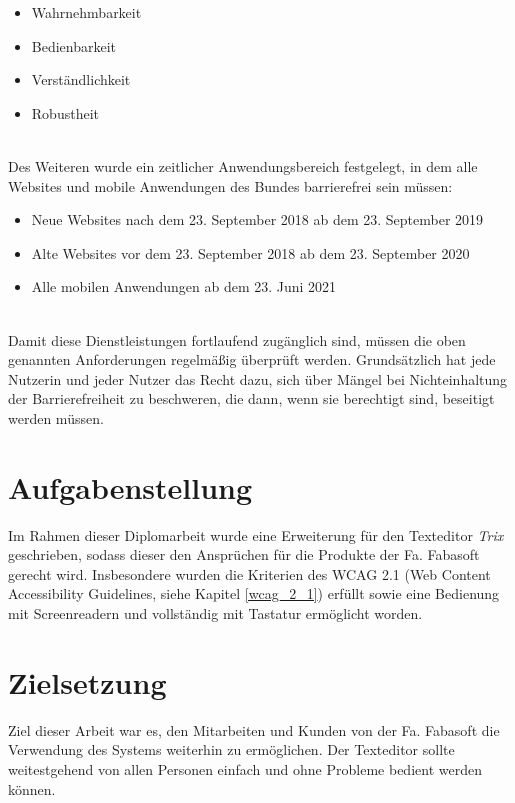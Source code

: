 \begin{itemize}
    \item Wahrnehmbarkeit
    \item Bedienbarkeit
    \item Verständlichkeit
    \item Robustheit
\end{itemize}

\mbox{}\\Des Weiteren wurde ein zeitlicher Anwendungsbereich festgelegt, in dem alle Websites und mobile Anwendungen des Bundes barrierefrei sein müssen:

\begin{itemize}
    \item Neue Websites nach dem 23. September 2018 ab dem 23. September 2019
    \item Alte Websites vor dem 23. September 2018 ab dem 23. September 2020
    \item Alle mobilen Anwendungen ab dem 23. Juni 2021
\end{itemize}

\mbox{}\\Damit diese Dienstleistungen fortlaufend zugänglich sind, müssen die oben genannten Anforderungen regelmäßig überprüft werden. Grundsätzlich hat jede Nutzerin und jeder Nutzer das Recht dazu, sich über Mängel bei Nichteinhaltung der Barrierefreiheit zu beschweren, die dann, wenn sie berechtigt sind, beseitigt werden müssen. 

\section{Aufgabenstellung}
Im Rahmen dieser Diplomarbeit wurde eine Erweiterung für den Texteditor {\em{Trix}} geschrieben, sodass dieser den Ansprüchen für die Produkte der Fa. Fabasoft gerecht wird.  Insbesondere wurden die Kriterien des WCAG 2.1 (Web Content Accessibility Guidelines, siehe Kapitel \ref{wcag_2_1}) erfüllt sowie eine Bedienung mit Screenreadern und vollständig mit Tastatur ermöglicht worden.

\section{Zielsetzung}
Ziel dieser Arbeit war es, den Mitarbeiten und Kunden von der Fa. Fabasoft die Verwendung des Systems weiterhin zu ermöglichen. Der Texteditor sollte weitestgehend von allen Personen einfach und ohne Probleme bedient werden können.

